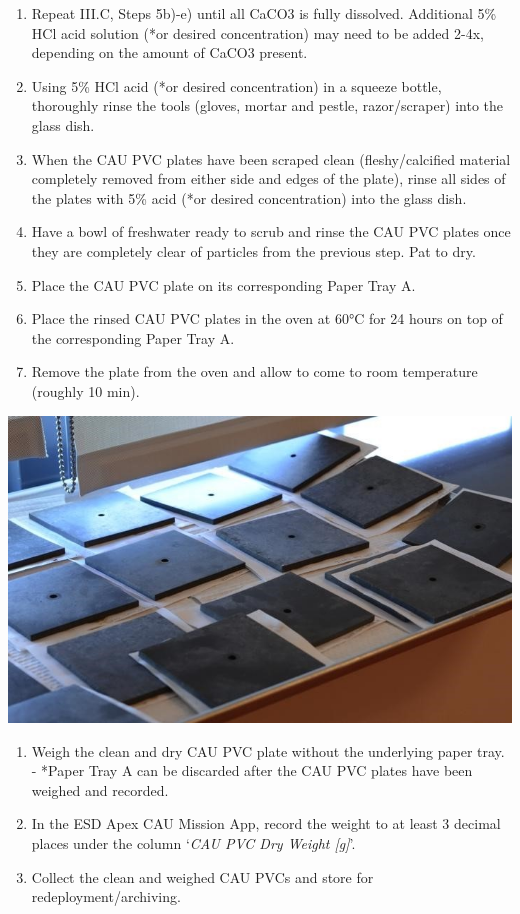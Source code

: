 \documentclass[]{book}
\begin{document}
\begin{enumerate}
\def\labelenumi{\arabic{enumi}.}
\setcounter{enumi}{5}
\item
  Repeat III.C, Steps 5b)-e) until all CaCO3 is fully dissolved. Additional 5\% HCl acid solution (*or desired concentration) may need to be added 2-4x, depending on the amount of CaCO3 present.
\item
  Using 5\% HCl acid (*or desired concentration) in a squeeze bottle, thoroughly rinse the tools (gloves, mortar and pestle, razor/scraper) into the glass dish.
\item
  When the CAU PVC plates have been scraped clean (fleshy/calcified material completely removed from either side and edges of the plate), rinse all sides of the plates with 5\% acid (*or desired concentration) into the glass dish.
\item
  Have a bowl of freshwater ready to scrub and rinse the CAU PVC plates once they are completely clear of particles from the previous step. Pat to dry.
\item
  Place the CAU PVC plate on its corresponding Paper Tray A.
\item
  Place the rinsed CAU PVC plates in the oven at 60°C for 24 hours on top of the corresponding Paper Tray A.
\item
  Remove the plate from the oven and allow to come to room temperature (roughly 10 min).
\end{enumerate}

\includegraphics{images/CAU_drying.jpg}

\begin{enumerate}
\def\labelenumi{\arabic{enumi}.}
\setcounter{enumi}{12}
\item
  Weigh the clean and dry CAU PVC plate without the underlying paper tray. - *Paper Tray A can be discarded after the CAU PVC plates have been weighed and recorded.
\item
  In the ESD Apex CAU Mission App, record the weight to at least 3 decimal places under the column `\emph{CAU PVC Dry Weight {[}g{]}}'.
\item
  Collect the clean and weighed CAU PVCs and store for redeployment/archiving.
\end{enumerate}
\end{document}
